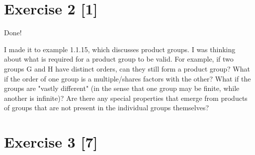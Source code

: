 \documentclass{article}
\begin{document}
\section*{Exercise 2 [1]}
Done! 

I made it to example 1.1.15, which discusses product groups. I was thinking 
about what is required for a product group to be valid. For example, if two 
groups G and H have distinct orders, can they still form a product group? What 
if the order of one group is a multiple/shares factors with the other? What if 
the groups are "vastly different" (in the sense that one group may be finite, 
while another is infinite)? Are there any special properties that emerge from 
products of groups that are not present in the individual groups themselves?
\pagebreak

\section*{Exercise 3 [7]}
\end{document}
